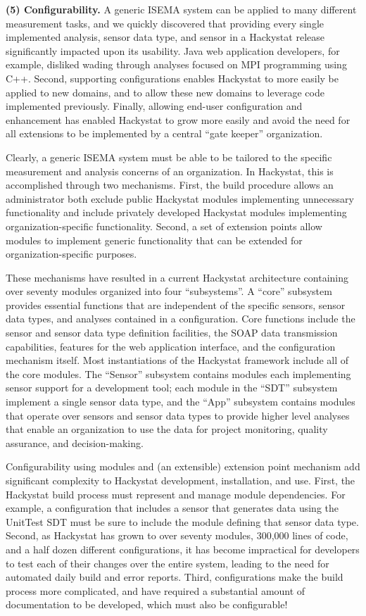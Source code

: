 \documentclass[10pt,twocolumn]{article}
\begin{document}
{\bf (5) Configurability.} A generic ISEMA system can be applied to many
different measurement tasks, and we quickly discovered that providing every
single implemented analysis, sensor data type, and sensor in a Hackystat
release significantly impacted upon its usability.  Java web application
developers, for example, disliked wading through analyses focused on MPI
programming using C++. Second, supporting configurations enables Hackystat
to more easily be applied to new domains, and to allow these new domains to
leverage code implemented previously. Finally, allowing end-user
configuration and enhancement has enabled Hackystat to grow more easily and
avoid the need for all extensions to be implemented by a central ``gate
keeper'' organization.

Clearly, a generic ISEMA system must be able to be tailored to the specific
measurement and analysis concerns of an organization. In Hackystat, this is
accomplished through two mechanisms. First, the build procedure allows an
administrator both exclude public Hackystat modules implementing
unnecessary functionality and include privately developed Hackystat modules
implementing organization-specific functionality. Second, a set of
extension points allow modules to implement generic functionality that can
be extended for organization-specific purposes.  

These mechanisms have resulted in a current Hackystat architecture
containing over seventy modules organized into four ``subsystems''.  A
``core'' subsystem provides essential functions that are independent of the
specific sensors, sensor data types, and analyses contained in a
configuration.  Core functions include the sensor and sensor data type
definition facilities, the SOAP data transmission capabilities, features
for the web application interface, and the configuration mechanism itself.
Most instantiations of the Hackystat framework include all of the core
modules. The ``Sensor'' subsystem contains modules each implementing sensor
support for a development tool; each module in the ``SDT'' subsystem
implement a single sensor data type, and the ``App'' subsystem contains
modules that operate over sensors and sensor data types to provide higher
level analyses that enable an organization to use the data for project
monitoring, quality assurance, and decision-making.

Configurability using modules and (an extensible) extension point mechanism
add significant complexity to Hackystat development, installation, and use.
First, the Hackystat build process must represent and manage module
dependencies. For example, a configuration that includes a sensor that
generates data using the UnitTest SDT must be sure to include the module
defining that sensor data type.  Second, as Hackystat has grown to over
seventy modules, 300,000 lines of code, and a half dozen different
configurations, it has become impractical for developers to test each of
their changes over the entire system, leading to the need for automated
daily build and error reports.  Third, configurations make the build
process more complicated, and have required a substantial amount of
documentation to be developed, which must also be configurable!
\end{document}
